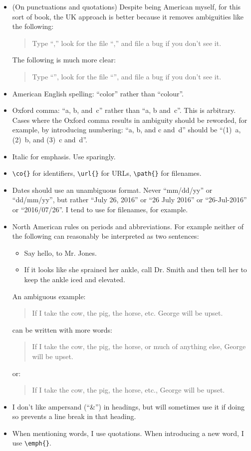 \begin{itemize}
\item (On punctuations and quotations)
  Despite being American myself, for this sort of book, the UK approach
  is better because it removes ambiguities like the following:
  \begin{quote}
    Type ``,'' look for the file ``,''
    and file a bug if you don't see it.
  \end{quote}

  The following is much more clear:
  \begin{quote}
    Type ``'', look for the file ``'',
    and file a bug if you don't see it.
  \end{quote}
\item American English spelling: ``color'' rather than ``colour''.
\item Oxford comma: ``a, b, and~c'' rather than ``a, b and~c''.
  This is arbitrary.  Cases where the Oxford comma results in ambiguity
  should be reworded, for example, by introducing numbering:  ``a,
  b, and c and~d'' should be ``(1)~a, (2)~b, and (3)~c and~d''.
\item Italic for emphasis.  Use sparingly.
\item \verb|\co{}| for identifiers, \verb|\url{}| for URLs,
  \verb|\path{}| for filenames.
\item Dates should use an unambiguous format.  Never ``mm/dd/yy''
  or ``dd/mm/yy'', but rather ``July 26, 2016'' or ``26 July 2016''
  or ``26-Jul-2016'' or ``2016/07/26''.  I tend to use
   for filenames, for example.
\item North American rules on periods and abbreviations.
  For example neither of the following can reasonably be interpreted
  as two sentences:
  \begin{itemize}
  \item Say hello, to Mr. Jones.
  \item If it looks like she sprained her ankle, call Dr. Smith and
    then tell her to keep the ankle iced and elevated.
  \end{itemize}

  An ambiguous example:
  \begin{quote}
    If I take the cow, the pig, the horse, etc. George will be upset.
  \end{quote}
  can be written with more words:
  \begin{quote}
    If I take the cow, the pig, the horse, or much of anything else,
    George will be upset.
  \end{quote}
  or:
  \begin{quote}
    If I take the cow, the pig, the horse, etc., George will be upset.
  \end{quote}
\item I don't like ampersand (``\&'') in headings, but will sometimes
  use it if doing so prevents a line break in that heading.
\item When mentioning words, I use quotations.  When introducing
  a new word, I use \verb|\emph{}|.
\end{itemize}

